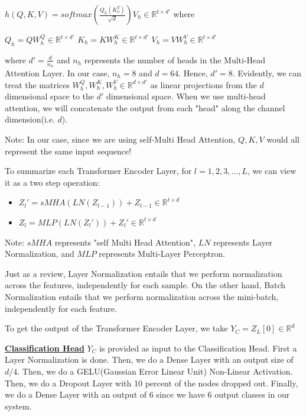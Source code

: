 \documentclass[conference]{IEEEtran}
\begin{document}
$h(Q, K, V) = softmax(\frac{Q_h (K_h^T)}{\sqrt{d}}) V_h \in \mathbb{R}^{t \times d'}$ where \newline

$Q_h = QW_h^Q \in \mathbb{R}^{t \times d'}$ \newline 
$K_h = KW_h^K \in \mathbb{R}^{t \times d'}$ \newline 
$V_h = VW_h^V \in \mathbb{R}^{t \times d'}$ \newline 

where $d' = \frac{d}{n_h}$ and $n_h$ represents the number of heads in the Multi-Head Attention Layer. In our case, $n_h = 8$ and $d = 64$. Hence, $d' = 8$. Evidently, we can treat the matrices $W_h^Q, W_h^K, W_h^V \in \mathbb{R}^{d \times d'}$ as linear projections from the $d$ dimensional space to the $d'$ dimensional space. When we use multi-head attention, we will concatenate the output from each "head" along the channel dimension(i.e. $d$). \newline 

Note: In our case, since we are using self-Multi Head Attention, $Q, K, V$ would all represent the same input sequence! \newline 

To summarize each Transformer Encoder Layer, for $l = 1, 2, 3, ..., L$, we can view it as a two step operation: 
\begin{itemize}
    \item $Z_l ' = sMHA(LN(Z_{l-1})) + Z_{l - 1} \in \mathbb{R}^{t \times d}$
    \item $Z_l = MLP(LN(Z_{l} ')) + Z_{l} ' \in \mathbb{R}^{t \times d}$
\end{itemize}

Note: $sMHA$ represents "self Multi Head Attention", $LN$ represents Layer Normalization, and $MLP$ represents Multi-Layer Perceptron. \newline 

Just as a review, Layer Normalization entails that we perform normalization across the features, independently for each sample. On the other hand, Batch Normalization entails that we perform normalization across the mini-batch, independently for each feature. \newline 


To get the output of the Transformer Encoder Layer, we take $Y_C = Z_L[0] \in \mathbb{R}^d$ \newline

\textbf{\underline{Classification Head}} \newline 
$Y_C$ is provided as input to the Classification Head. First a Layer Normalization is done. Then, we do a Dense Layer with an output size of $d/4$. Then, we do a GELU(Gaussian Error Linear Unit) Non-Linear Activation. Then, we do a Dropout Layer with 10 percent of the nodes dropped out. Finally, we do a Dense Layer with an output of 6 since we have 6 output classes in our system. 
\end{document}
